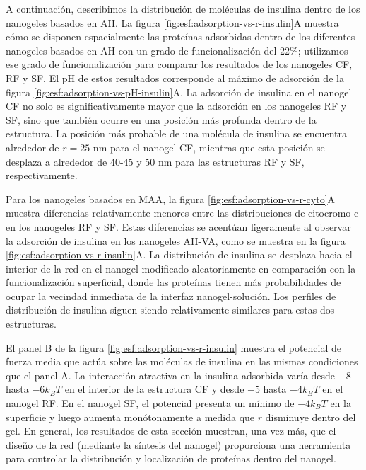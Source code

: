 A continuaci\'on, describimos la distribuci\'on de mol\'eculas de insulina dentro de los nanogeles basados en AH.
La figura \ref{fig:esf:adsorption-vs-r-insulin}A muestra c\'omo se disponen espacialmente las prote\'inas adsorbidas dentro de los diferentes nanogeles basados en AH con un grado de funcionalizaci\'on del $22\%$;
utilizamos ese grado de funcionalizaci\'on para comparar los resultados de los nanogeles CF, RF y SF.
El pH de estos resultados corresponde al m\'aximo de adsorci\'on de la figura \ref{fig:esf:adsorption-vs-pH-insulin}A.
La adsorci\'on de insulina en el nanogel CF no solo es significativamente mayor que la adsorci\'on en los nanogeles RF y SF, sino que tambi\'en ocurre en una posici\'on m\'as profunda dentro de la estructura.
La posici\'on m\'as probable de una mol\'ecula de insulina se encuentra alrededor de $r=25$ nm para el nanogel CF,
mientras que esta posici\'on se desplaza a alrededor de 40-45 y 50 nm para las estructuras RF y SF, respectivamente.

Para los nanogeles basados en MAA, la figura \ref{fig:esf:adsorption-vs-r-cyto}A muestra diferencias relativamente menores entre las distribuciones de citocromo c en los nanogeles RF y SF.
Estas diferencias se acent\'uan ligeramente al observar la adsorci\'on de insulina en los nanogeles AH-VA, como se muestra en la figura \ref{fig:esf:adsorption-vs-r-insulin}A.
La distribuci\'on de insulina se desplaza hacia el interior de la red en el nanogel modificado aleatoriamente en comparaci\'on con la funcionalizaci\'on superficial, donde las prote\'inas tienen m\'as probabilidades de ocupar la vecindad inmediata de la interfaz nanogel-soluci\'on.
Los perfiles de distribuci\'on de insulina siguen siendo relativamente similares para estas dos estructuras.

El panel B de la figura \ref{fig:esf:adsorption-vs-r-insulin} muestra el potencial de fuerza media que act\'ua sobre las mol\'eculas de insulina en las mismas condiciones que el panel A.
La interacci\'on atractiva en la insulina adsorbida var\'ia desde $-8$ hasta $-6 k_B T$ en el interior de la estructura CF y desde $-5$ hasta $-4 k_B T$ en el nanogel RF.
En el nanogel SF, el potencial presenta un m\'inimo de $-4 k_B T$ en la superficie y luego aumenta mon\'otonamente a medida que $r$ disminuye dentro del gel.
En general, los resultados de esta secci\'on muestran, una vez m\'as, que el dise\~no de la red (mediante la s\'intesis del nanogel) proporciona una herramienta para controlar la distribuci\'on y localizaci\'on de prote\'inas dentro del nanogel.






